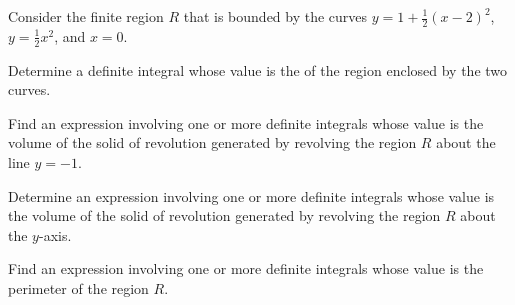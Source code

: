 \begin{exercises}
    
   \item  Consider the finite region $R$ that is bounded by the curves $y = 1+\frac{1}{2}(x-2)^2$, $y=\frac{1}{2}x^2$, and $x = 0$.
         \ba
		\item Determine a definite integral whose value is the of the region enclosed by the two curves.  
    		\item Find an expression involving one or more definite integrals whose value is the volume of the solid of revolution generated by revolving the region $R$ about the line $y = -1$. 
		\item Determine an expression involving one or more definite integrals whose value is the volume of the solid of revolution generated by revolving the region $R$ about the $y$-axis.  
		\item Find an expression involving one or more definite integrals whose value is the perimeter of the region $R$.
         \ea
   
\end{exercises}
\afterexercises

